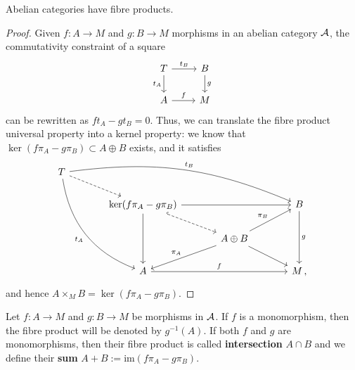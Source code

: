 \begin{prop}
	Abelian categories have fibre products.
	\begin{proof}
		Given $f:A \to M$ and $g:B \to M$ morphisms in an abelian category $\mathcal{A}$,
		the commutativity constraint of a square
		\begin{equation*}
			\begin{tikzcd}
				T \ar[d, "t_{A}"'] \ar[r, "t_{B}"] & B \ar[d, "g"] \\
				A \ar[r, "f"] & M
			\end{tikzcd}
		\end{equation*}
		can be rewritten as $ft_{A} - gt_{B} = 0$. 
		Thus, we can translate the fibre product universal property into
		a kernel property: we know that $\ker(f \pi_{A} - g \pi_{B}) \subset A \oplus B$ exists,
		and it satisfies
		\begin{equation*}
			\begin{tikzcd}[column sep=large]
				T \ar[dddr, bend right, "t_{A}"'] \ar[rrrd, bend left=15pt, "t_{B}"] 
				\ar[dr, dashed] & & & \\
				& \ker(f \pi_{A} - g \pi_{B}) \ar[rr] \ar[dr,hook, dashed] \ar[dd]
				& & B \ar[dd, "g"] \\
				& & A \oplus B \ar[dl, "\pi_{A}"'] \ar[ur, "\pi_{B}"] \ar[dr] & \\ %
				& A \ar[rr, "f"] & & M\,,
			\end{tikzcd}
		\end{equation*}
		and hence $A \times_{M} B = \ker(f \pi_{A} - g \pi_{B})$.
	\end{proof}
\end{prop}

\begin{df}
	Let $f:A \to M$ and $g:B \to M$ be morphisms in $\mathcal{A}$.
	If $f$ is a monomorphism, then the fibre product will be denoted by $g^{-1}(A)$.
	If both $f$ and $g$ are monomorphisms, then their fibre product
	is called \textbf{intersection} $A \cap B$ and we define their \textbf{sum}
	$A + B := \mathrm{im}(f \pi_{A} - g \pi_{B})$.
\end{df}

